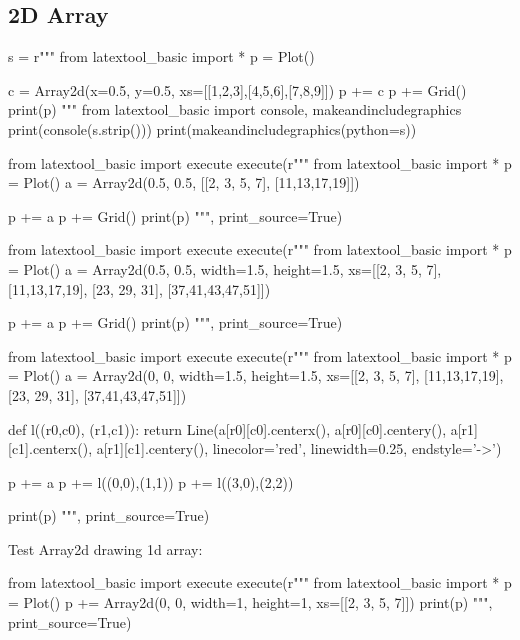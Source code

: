 \subsection{2D Array}

\begin{samepage}
\begin{python}
s = r"""
from latextool_basic import *
p = Plot()

c = Array2d(x=0.5, y=0.5, xs=[[1,2,3],[4,5,6],[7,8,9]])
p += c
p += Grid()
print(p)
"""
from latextool_basic import console, makeandincludegraphics
print(console(s.strip()))
print(makeandincludegraphics(python=s))
\end{python}
\end{samepage}


\begin{python}
from latextool_basic import execute
execute(r"""
from latextool_basic import *
p = Plot()
a = Array2d(0.5, 0.5, [[2, 3, 5, 7], [11,13,17,19]])

p += a 
p += Grid()
print(p)
""", print_source=True)
\end{python}


\begin{python}
from latextool_basic import execute
execute(r"""
from latextool_basic import *
p = Plot()
a = Array2d(0.5, 0.5, width=1.5, height=1.5, xs=[[2, 3, 5, 7], [11,13,17,19], [23, 29, 31], [37,41,43,47,51]])

p += a
p += Grid() 
print(p)
""", print_source=True)
\end{python}


\begin{python}
from latextool_basic import execute
execute(r"""
from latextool_basic import *
p = Plot()
a = Array2d(0, 0, width=1.5, height=1.5, xs=[[2, 3, 5, 7], [11,13,17,19], [23, 29, 31], [37,41,43,47,51]])

def l((r0,c0), (r1,c1)):
    return Line(a[r0][c0].centerx(), a[r0][c0].centery(),
           a[r1][c1].centerx(), a[r1][c1].centery(),
           linecolor='red', linewidth=0.25, endstyle='->')

p += a
p += l((0,0),(1,1))
p += l((3,0),(2,2))

print(p)
""", print_source=True)
\end{python}


Test Array2d drawing 1d array:
\begin{python}
from latextool_basic import execute
execute(r"""
from latextool_basic import *
p = Plot()
p += Array2d(0, 0, width=1, height=1, xs=[[2, 3, 5, 7]])
print(p)
""", print_source=True)
\end{python}


